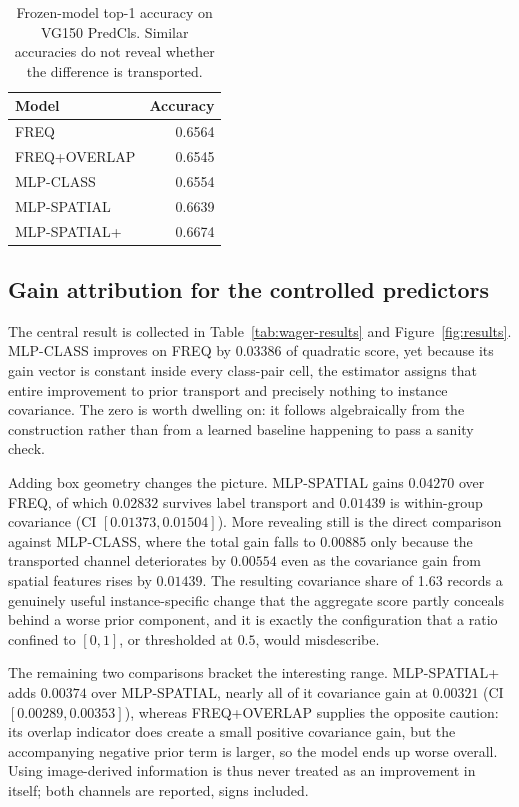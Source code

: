 \begin{table}[t]
\centering
\caption{Frozen-model top-1 accuracy on VG150 PredCls. Similar accuracies do not reveal
whether the difference is transported.}
\label{tab:accuracy}
\begin{tabular}{@{}lr@{}}
\toprule
Model & Accuracy \\
\midrule
FREQ & 0.6564 \\
FREQ+OVERLAP & 0.6545 \\
MLP-CLASS & 0.6554 \\
MLP-SPATIAL & 0.6639 \\
MLP-SPATIAL+ & 0.6674 \\
\bottomrule
\end{tabular}
\end{table}

\subsection{Gain attribution for the controlled predictors}\label{sec:results}

The central result is collected in Table~\ref{tab:wager-results} and
Figure~\ref{fig:results}. MLP-CLASS improves on FREQ by $0.03386$ of quadratic score,
yet because its gain vector is constant inside every class-pair cell, the estimator
assigns that entire improvement to prior transport and precisely nothing to instance
covariance. The zero is worth dwelling on: it follows algebraically from the construction
rather than from a learned baseline happening to pass a sanity check.

Adding box geometry changes the picture. MLP-SPATIAL gains $0.04270$ over FREQ, of which
$0.02832$ survives label transport and $0.01439$ is within-group covariance (CI
$[0.01373,0.01504]$). More revealing still is the direct comparison against MLP-CLASS,
where the total gain falls to $0.00885$ only because the transported channel deteriorates by
$0.00554$ even as the covariance gain from spatial features rises by $0.01439$. The resulting covariance share
of 1.63 records a genuinely useful instance-specific change that the aggregate score
partly conceals behind a worse prior component, and it is exactly the configuration that
a ratio confined to $[0,1]$, or thresholded at $0.5$, would misdescribe.

The remaining two comparisons bracket the interesting range. MLP-SPATIAL+ adds $0.00374$
over MLP-SPATIAL, nearly all of it covariance gain at $0.00321$ (CI $[0.00289,0.00353]$),
whereas FREQ+OVERLAP supplies the opposite caution: its overlap indicator does create a
small positive covariance gain, but the accompanying negative prior term is larger, so
the model ends up worse overall. Using image-derived information is thus never treated
as an improvement in itself; both channels are reported, signs included.

